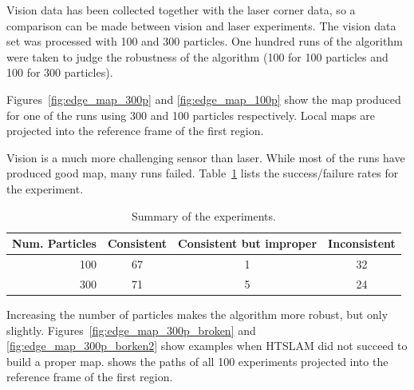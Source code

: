 Vision data has been collected together with the laser corner data, so
a comparison can be made between vision and laser experiments. The vision
data set was processed with 100 and 300 particles. One hundred runs of
the algorithm were taken to judge the robustness of the algorithm (100
for 100 particles and 100 for 300 particles).

Figures~\ref{fig:edge_map_300p} and \ref{fig:edge_map_100p} show the
map produced for one of the runs using 300 and 100 particles
respectively. Local maps are projected into the reference frame of the
first region. 

Vision is a much more challenging sensor than laser. While most of the
runs have produced good map, many runs
failed. Table~\ref{tab:results_vision} lists the success/failure rates
for the experiment.

\begin{table}[ht]
\center
\begin{tabular}{r|c|c|c}
Num. Particles & Consistent & Consistent but improper & Inconsistent\\
\hline
100 & 67 & 1 & 32\\
300 & 71 & 5 & 24\\
\end{tabular}
\caption{Summary of the experiments.}
\label{tab:results_vision}
\end{table}

Increasing the number of particles makes the algorithm more robust,
but only slightly. Figures~\ref{fig:edge_map_300p_broken} and
\ref{fig:edge_map_300p_borken2} show examples when HTSLAM did not
succeed to build a proper map.  shows the
paths of all 100 experiments projected into the reference frame of the
first region.


